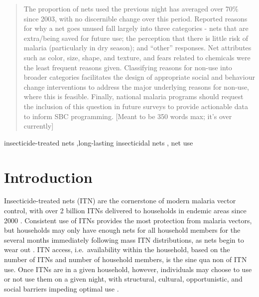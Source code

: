 \documentclass[review,
3p]{elsarticle} %
\begin{document}
\begin{frontmatter}
\begin{abstract}
  The proportion of nets used the previous night has averaged over 70\%
  since 2003, with no discernible change over this period. Reported
  reasons for why a net goes unused fall largely into three categories -
  nets that are extra/being saved for future use; the perception that
  there is little risk of malaria (particularly in dry season); and
  ``other'' responses. Net attributes such as color, size, shape, and
  texture, and fears related to chemicals were the least frequent
  reasons given. Classifying reasons for non-use into broader categories
  facilitates the design of appropriate social and behaviour change
  interventions to address the major underlying reasons for non-use,
  where this is feasible. Finally, national malaria programs should
  request the inclusion of this question in future surveys to provide
  actionable data to inform SBC programming. {[}Meant to be 350 words
  max; it's over currently{]}
  \end{abstract}
    \begin{keyword}
    insecticide-treated nets \sep long-lasting insecticidal nets \sep 
    net use
  \end{keyword}
  
 \end{frontmatter}

\hypertarget{introduction}{%
\section{Introduction}\label{introduction}}

Insecticide-treated nets (ITN) are the cornerstone of modern malaria
vector control, with over 2 billion ITNs delivered to households in
endemic areas since 2000 \citep{Milliner:2016um}. Consistent use of ITNs
provides the most protection from malaria vectors, but households may
only have enough nets for all household members for the several months
immediately following mass ITN distributions, as nets begin to wear out
\citep{Bhatt:2015gn, Koenker:2018gx, Girond:2018bc, 10.1038/s41467-021-23707-7}.
ITN access, i.e.~availability within the household, based on the number
of ITNs and number of household members, is the sine qua non of ITN use.
Once ITNs are in a given household, however, individuals may choose to
use or not use them on a given night, with structural, cultural,
opportunistic, and social barriers impeding optimal use
\citep{Pulford:2011dc, 10.1080/13648470.2021.1884185}.
\end{document}
